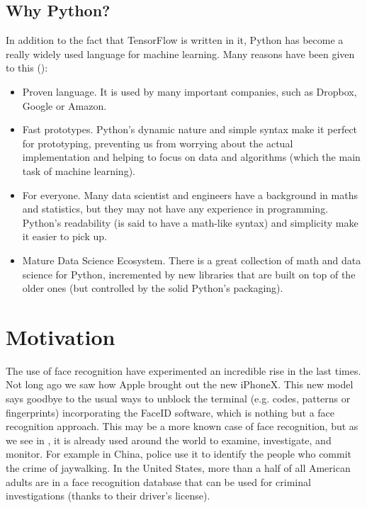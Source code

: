 	\subsection{Why Python?}
	In addition to the fact that TensorFlow is written in it, Python has become a really widely used language for machine learning. Many reasons have been given to this (\cite{why_python}):

	\begin{itemize}
		\item Proven language. It is used by many important companies, such as Dropbox, Google or Amazon. 
		\item Fast prototypes. Python's dynamic nature and simple syntax make it perfect for prototyping, preventing us from worrying about the actual implementation and helping to focus on data and algorithms (which the main task of machine learning).
		\item For everyone. Many data scientist and engineers have a background in maths and statistics, but they may not have any experience in programming. Python's readability (is said to have a math-like syntax) and simplicity make it easier to pick up.
		\item Mature Data Science Ecosystem. There is a great collection of math and data science for Python, incremented by new libraries that are built on top of the older ones (but controlled by the solid Python's packaging). 
	\end{itemize}


\section{Motivation}
The use of face recognition have experimented an incredible rise in the last times. Not long ago we saw how Apple brought out the new iPhoneX. This new model says goodbye to the usual ways to unblock the terminal (e.g. codes, patterns or fingerprints) incorporating the FaceID software, which is nothing but a face recognition approach. This may be a more known case of face recognition, but as we see in \cite{iphonex_and_other_uses}, it is already used around the world to examine, investigate, and monitor. For example in China, police use it to identify the people who commit the crime of jaywalking. In the United States, more than a half of all American adults are in a face recognition database that can be used for criminal investigations (thanks to their driver’s license).





